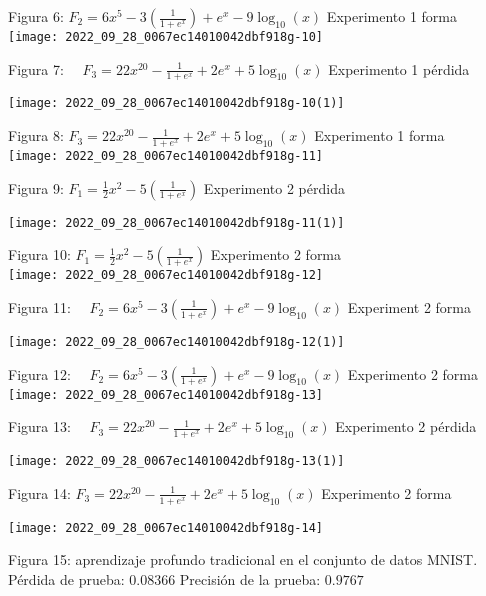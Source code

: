 \documentclass[10pt]{article}
\begin{document}
Figura 6: $F_{2}=6 x^{5}-3\left(\frac{1}{1+e^{x}}\right)+e^{x}-9 \log _{10}(x)$ Experimento 1 forma\\

\texttt{[image: 2022\_09\_28\_0067ec14010042dbf918g-10]}

Figura 7: $\quad F_{3}=22 x^{20}-\frac{1}{1+e^{x}}+2 e^{x}+5 \log _{10}(x)$ Experimento 1 pérdida

\texttt{[image: 2022\_09\_28\_0067ec14010042dbf918g-10(1)]}

Figura 8: $F_{3}=22 x^{20}-\frac{1}{1+e^{x}}+2 e^{x}+5 \log _{10}(x)$ Experimento 1 forma\\

\texttt{[image: 2022\_09\_28\_0067ec14010042dbf918g-11]}

Figura 9: $F_{1}=\frac{1}{2} x^{2}-5\left(\frac{1}{1+e^{x}}\right)$ Experimento 2 pérdida

\texttt{[image: 2022\_09\_28\_0067ec14010042dbf918g-11(1)]}

Figura 10: $F_{1}=\frac{1}{2} x^{2}-5\left(\frac{1}{1+e^{x}}\right)$ Experimento 2 forma\\

\texttt{[image: 2022\_09\_28\_0067ec14010042dbf918g-12]}

Figura 11: $\quad F_{2}=6 x^{5}-3\left(\frac{1}{1+e^{x}}\right)+e^{x}-9 \log _{10}(x)$ Experiment 2 forma

\texttt{[image: 2022\_09\_28\_0067ec14010042dbf918g-12(1)]}

Figura 12: $\quad F_{2}=6 x^{5}-3\left(\frac{1}{1+e^{x}}\right)+e^{x}-9 \log _{10}(x)$ Experimento 2 forma\\

\texttt{[image: 2022\_09\_28\_0067ec14010042dbf918g-13]}

Figura 13: $\quad F_{3}=22 x^{20}-\frac{1}{1+e^{x}}+2 e^{x}+5 \log _{10}(x)$ Experimento 2 pérdida

\texttt{[image: 2022\_09\_28\_0067ec14010042dbf918g-13(1)]}

Figura 14: $F_{3}=22 x^{20}-\frac{1}{1+e^{x}}+2 e^{x}+5 \log _{10}(x)$ Experimento 2 forma

\texttt{[image: 2022\_09\_28\_0067ec14010042dbf918g-14]}

Figura 15: aprendizaje profundo tradicional en el conjunto de datos MNIST. Pérdida de prueba: $0.08366$ Precisión de la prueba: $0.9767$
\end{document}
